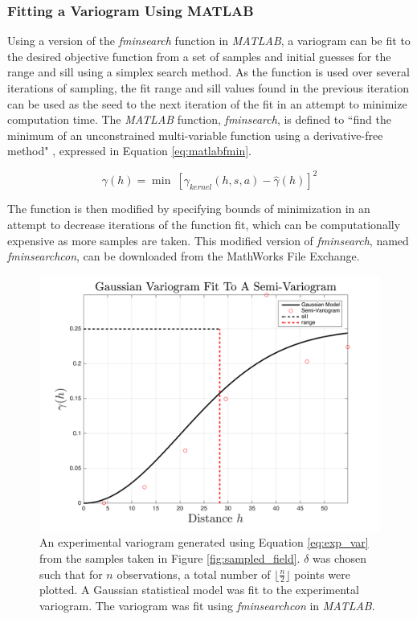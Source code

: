 \subsubsection{Fitting a Variogram Using MATLAB}
Using a version of the \textit{fminsearch} function in \textit{MATLAB}, a variogram can be fit to the desired objective function from a set of samples and initial guesses for the range and sill using a simplex search method. As the function is used over several iterations of sampling, the fit range and sill values found in the previous iteration can be used as the seed to the next iteration of the fit in an attempt to minimize computation time. The \textit{MATLAB} function, \textit{fminsearch}, is defined to ``find the minimum of an unconstrained multi-variable function using a derivative-free method" \cite{mathworks:fminsearch}, expressed in Equation \ref{eq:matlabfmin}.

\begin{equation}
    \gamma(h) = \min\ [\gamma_{kernel}(h,s,a) - \hat{\gamma}(h)]^2
    \label{eq:matlabfmin}
\end{equation}

The function is then modified by specifying bounds of minimization in an attempt to decrease iterations of the function fit, which can be computationally expensive as more samples are taken. This modified version of \textit{fminsearch}, named \textit{fminsearchcon}, can be downloaded from the MathWorks File Exchange.

\begin{figure}[ht!]
    \centering    
	\includegraphics[width=0.8\linewidth]{figures/fit_kernel.png}
    \ssp
	\caption{An experimental variogram generated using Equation \ref{eq:exp_var} from the samples taken in Figure \ref{fig:sampled_field}. $\delta$ was chosen such that for $n$ observations, a total number of $\Big\lfloor \frac{n}{2} \Big\rfloor$ points were plotted. A Gaussian statistical model was fit to the experimental variogram. The variogram was fit using \textit{fminsearchcon} in \textit{MATLAB}.}
	\label{fig:fit_kernel}
\end{figure}

